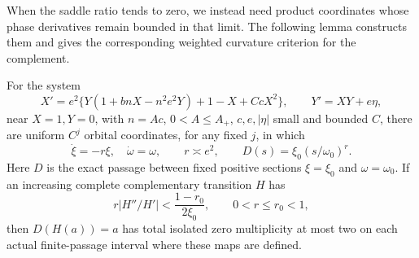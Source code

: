 When the saddle ratio tends to zero, we instead need product coordinates
whose phase derivatives remain bounded in that limit. The following
lemma constructs them and gives the corresponding weighted curvature
criterion for the complement.

\begin{lemma}\label{lem:small-ratio-saddle}
For the system
\begin{equation}\label{eq:simple-small-ratio-system}
 X'=e^2\{Y(1+bnX-n^2e^2Y)+1-X+CcX^2\},\qquad
 Y'=XY+e\eta,
\end{equation}
near $X=1,Y=0$, with $n=Ac$, $0<A\le A_+$,
$c,e,|\eta|$ small and bounded $C$, there are
uniform $C^j$ orbital coordinates, for any fixed $j$, in which
\begin{equation}\label{eq:simple-exact-power}
 \dot\xi=-r\xi,\quad \dot\omega=\omega,\qquad
 r\asymp e^2,\qquad D(s)=\xi_0(s/\omega_0)^r.
\end{equation}
Here $D$ is the exact passage between fixed positive sections
$\xi=\xi_0$ and $\omega=\omega_0$.
If an increasing complete complementary transition $H$ has
\begin{equation}\label{eq:simple-small-ratio-curvature}
 r|H''/H'|<\frac{1-r_0}{2\xi_0},\qquad 0<r\le r_0<1,
\end{equation}
then $D(H(a))=a$ has total isolated zero multiplicity at most two on
each actual finite-passage interval where these maps are defined.
\end{lemma}

